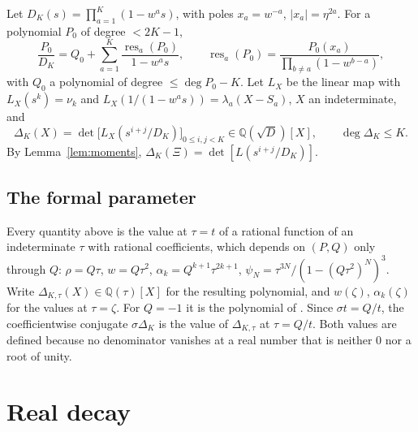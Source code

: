 \documentclass[11pt]{amsart}
\theoremstyle{definition}
\theoremstyle{remark}
\numberwithin{equation}{section}
\newcommand{\QQ}{\mathbb{Q}}
\newcommand{\Res}{\operatorname{res}}
\begin{document}
Let $D_K(s)=\prod_{a=1}^K(1-w^as)$, with poles $x_a=w^{-a}$, $|x_a|=\eta^{2a}$. For a polynomial $P_0$ of degree
$<2K-1$,
\[
\frac{P_0}{D_K}=Q_0+\sum_{a=1}^K\frac{\Res_a(P_0)}{1-w^as},\qquad \Res_a(P_0)=\frac{P_0(x_a)}{\prod_{b\ne a}(1-w^{b-a})},
\]
with $Q_0$ a polynomial of degree $\le\deg P_0-K$. Let $L_X$ be the linear map with $L_X(s^k)=\nu_k$ and
$L_X(1/(1-w^as))=\lambda_a(X-S_a)$, $X$ an indeterminate, and
\[
\Delta_K(X)=\det\bigl[L_X(s^{i+j}/D_K)\bigr]_{0\le i,j<K}\in\QQ(\sqrt D)[X],\qquad\deg\Delta_K\le K.
\]
By Lemma~\ref{lem:moments}, $\Delta_K(\Xi)=\det[L(s^{i+j}/D_K)]$.

\subsection*{The formal parameter}
Every quantity above is the value at $\tau=t$ of a rational function of an indeterminate $\tau$ with rational
coefficients, which depends on $(P,Q)$ only through $Q$: $\rho=Q\tau$, $w=Q\tau^2$, $\alpha_k=Q^{k+1}\tau^{2k+1}$,
$\psi_N=\tau^{3N}/(1-(Q\tau^2)^N)^3$. Write $\Delta_{K,\tau}(X)\in\QQ(\tau)[X]$ for the resulting polynomial, and
$w(\zeta)$, $\alpha_k(\zeta)$ for the values at $\tau=\zeta$. For $Q=-1$ it is the polynomial of \cite{Kri26}. Since
$\sigma t=Q/t$, the coefficientwise conjugate $\sigma\Delta_K$ is the value of $\Delta_{K,\tau}$ at $\tau=Q/t$. Both
values are defined because no denominator vanishes at a real number that is neither $0$ nor a root of unity.

\section{Real decay}\label{sec:decay}
\end{document}
